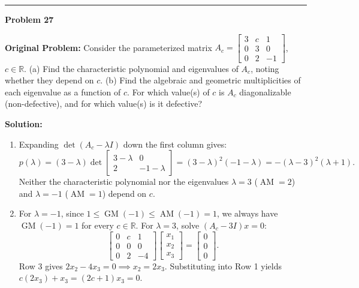 \documentclass[11pt, letterpaper]{article}
\theoremstyle{definition}
\theoremstyle{remark}
\begin{document}
\noindent\rule{\textwidth}{0.4pt}

\noindent\textbf{Problem 27}

\textbf{Original Problem:} Consider the parameterized matrix $A_c = \begin{bmatrix} 3 & c & 1 \\ 0 & 3 & 0 \\ 0 & 2 & -1 \end{bmatrix}$, $c \in \mathbb{R}$. (a) Find the characteristic polynomial and eigenvalues of $A_c$, noting whether they depend on $c$. (b) Find the algebraic and geometric multiplicities of each eigenvalue as a function of $c$. For which value(s) of $c$ is $A_c$ diagonalizable (non-defective), and for which value(s) is it defective?

\textbf{Solution:}
\begin{enumerate}[label=(\alph*), topsep=3pt, itemsep=4pt]
    \item Expanding $\det(A_c - \lambda I)$ down the first column gives:
    \[
    p(\lambda) = (3 - \lambda)\det\begin{bmatrix} 3 - \lambda & 0 \\ 2 & -1 - \lambda \end{bmatrix} = (3 - \lambda)^2(-1 - \lambda) = -(\lambda - 3)^2(\lambda + 1).
    \]
    Neither the characteristic polynomial nor the eigenvalues $\lambda = 3$ ($\operatorname{AM} = 2$) and $\lambda = -1$ ($\operatorname{AM} = 1$) depend on $c$.
    \item For $\lambda = -1$, since $1 \le \operatorname{GM}(-1) \le \operatorname{AM}(-1) = 1$, we always have $\operatorname{GM}(-1) = 1$ for every $c \in \mathbb{R}$. For $\lambda = 3$, solve $(A_c - 3I)x = 0$:
    \[
    \begin{bmatrix} 0 & c & 1 \\ 0 & 0 & 0 \\ 0 & 2 & -4 \end{bmatrix}\begin{bmatrix} x_1 \\ x_2 \\ x_3 \end{bmatrix} = \begin{bmatrix} 0 \\ 0 \\ 0 \end{bmatrix}.
    \]
    Row 3 gives $2x_2 - 4x_3 = 0 \implies x_2 = 2x_3$. Substituting into Row 1 yields $c(2x_3) + x_3 = (2c + 1)x_3 = 0$.
    \begin{itemize}[topsep=2pt, itemsep=2pt]

\end{itemize}
\end{enumerate}
\end{document}
